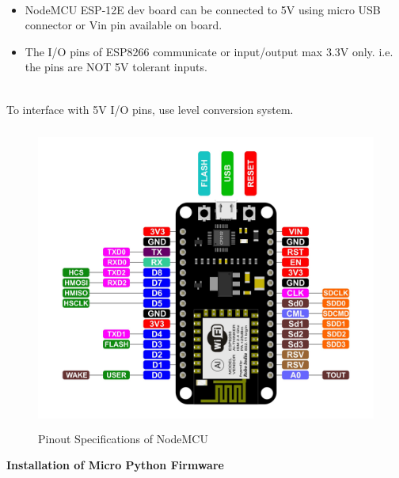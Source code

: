 \documentclass[12pt,a4paper]{article}
\begin{document}
\\
\begin{itemize}[noitemsep,nolistsep]
    \item NodeMCU ESP-12E dev board can be connected to 5V using micro USB connector or Vin pin available on board.
    \item The I/O pins of ESP8266 communicate or input/output max 3.3V only. i.e. the pins are NOT 5V tolerant inputs. 
\end{itemize}
\\
To interface with 5V I/O pins, use level conversion system. 
\begin{figure}[h!]
    \centering
	\includegraphics[width=15cm, height=10cm]{Introduction/17.jpg}
	\caption{Pinout Specifications of NodeMCU}
\end{figure}

\textbf{Installation of Micro Python Firmware}\\
\end{document}
